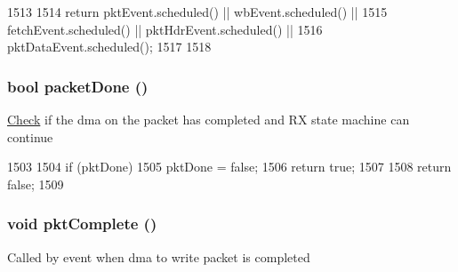 \begin{DoxyCode}
1513 {
1514     return pktEvent.scheduled() || wbEvent.scheduled() ||
1515         fetchEvent.scheduled() || pktHdrEvent.scheduled() ||
1516         pktDataEvent.scheduled();
1517          
1518 }
\end{DoxyCode}
\hypertarget{classIGbE_1_1RxDescCache_a430d1dfdf7dcec48b02f69d6769acab6}{
\subsubsection[{packetDone}]{\setlength{\rightskip}{0pt plus 5cm}bool packetDone ()}}
\label{classIGbE_1_1RxDescCache_a430d1dfdf7dcec48b02f69d6769acab6}
\hyperlink{classCheck}{Check} if the dma on the packet has completed and RX state machine can continue 


\begin{DoxyCode}
1503 {
1504     if (pktDone) {
1505         pktDone = false;
1506         return true;
1507     }
1508     return false;
1509 }
\end{DoxyCode}
\hypertarget{classIGbE_1_1RxDescCache_a4f0881be8aa8698e16dcf52a89085100}{
\subsubsection[{pktComplete}]{\setlength{\rightskip}{0pt plus 5cm}void pktComplete ()}}
\label{classIGbE_1_1RxDescCache_a4f0881be8aa8698e16dcf52a89085100}
Called by event when dma to write packet is completed 


